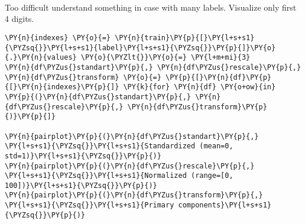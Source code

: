    \begin{center}
    \end{center}
    { \hspace*{\fill} \\}
    
    \begin{center}
    \end{center}
    { \hspace*{\fill} \\}
    
    \begin{center}
    \end{center}
    { \hspace*{\fill} \\}
    
 Too difficult understand something in case with many labels. Visualize only first 4 digits.
    
    \begin{tcolorbox}[breakable, size=fbox, boxrule=1pt, pad at break*=1mm,colback=cellbackground, colframe=cellborder]
\begin{Verbatim}[commandchars=\\\{\}]
\PY{n}{indexes} \PY{o}{=} \PY{n}{train}\PY{p}{[}\PY{l+s+s1}{\PYZsq{}}\PY{l+s+s1}{label}\PY{l+s+s1}{\PYZsq{}}\PY{p}{]}\PY{o}{.}\PY{n}{values} \PY{o}{\PYZlt{}}\PY{o}{=} \PY{l+m+mi}{3}
\PY{n}{df\PYZus{}standart}\PY{p}{,} \PY{n}{df\PYZus{}rescale}\PY{p}{,} \PY{n}{df\PYZus{}transform} \PY{o}{=} \PY{p}{[}\PY{n}{df}\PY{p}{[}\PY{n}{indexes}\PY{p}{]} \PY{k}{for} \PY{n}{df} \PY{o+ow}{in} \PY{p}{(}\PY{n}{df\PYZus{}standart}\PY{p}{,} \PY{n}{df\PYZus{}rescale}\PY{p}{,} \PY{n}{df\PYZus{}transform}\PY{p}{)}\PY{p}{]}

\PY{n}{pairplot}\PY{p}{(}\PY{n}{df\PYZus{}standart}\PY{p}{,} \PY{l+s+s1}{\PYZsq{}}\PY{l+s+s1}{Standardized (mean=0, std=1)}\PY{l+s+s1}{\PYZsq{}}\PY{p}{)}
\PY{n}{pairplot}\PY{p}{(}\PY{n}{df\PYZus{}rescale}\PY{p}{,} \PY{l+s+s1}{\PYZsq{}}\PY{l+s+s1}{Normalized (range=[0, 100])}\PY{l+s+s1}{\PYZsq{}}\PY{p}{)}
\PY{n}{pairplot}\PY{p}{(}\PY{n}{df\PYZus{}transform}\PY{p}{,} \PY{l+s+s1}{\PYZsq{}}\PY{l+s+s1}{Primary components}\PY{l+s+s1}{\PYZsq{}}\PY{p}{)}
\end{Verbatim}
\end{tcolorbox}

